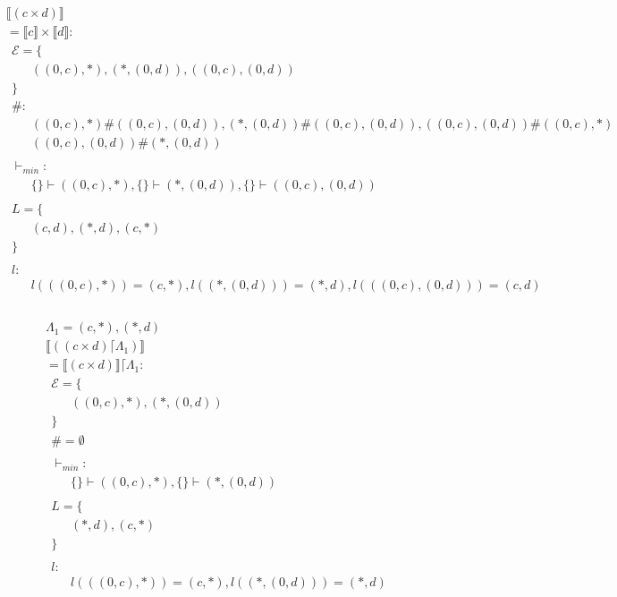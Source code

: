 \begin{align*} 
	 &  & \\ 
	 & \llbracket (c \times d) \rrbracket & \\ 
	 & = \llbracket c \rrbracket \times \llbracket d \rrbracket:  & \\ 
	 & \ \ \mathcal{{E}}= \{  & \\ 
	 & \qquad ((0, c), *), (*, (0, d)), ((0, c), (0, d)) \\ 
	 & \ \ \} & \\ 
	 & \ \ \#: & \\ 
	 & \qquad ((0, c), *) \# ((0, c), (0, d)), (*, (0, d)) \# ((0, c), (0, d)), ((0, c), (0, d)) \# ((0, c), *) \\ 
	 & \qquad ((0, c), (0, d)) \# (*, (0, d)) \\ 
	 & \ \  & \\ 
	 & \ \ \vdash_{{min}}: & \\ 
	 & \qquad \{  \} \vdash ((0, c), *), \{  \} \vdash (*, (0, d)), \{  \} \vdash ((0, c), (0, d)) \\ 
	 & \ \  & \\ 
	 & \ \ L=\{ & \\ 
	 & \qquad (c, d), (*, d), (c, *) \\ 
	 & \ \ \} & \\ 
	 & \ \  & \\ 
	 & \ \ l: & \\ 
	 & \qquad l(((0, c), *)) = (c, *), l((*, (0, d))) = (*, d), l(((0, c), (0, d))) = (c, d) \\ 
	 & \ \  & \\ 
\end{align*} 

\begin{align*} 
	 & \Lambda_1 = {(c, *), (*, d)} & \\ 
	 & \llbracket ((c \times d) \lceil \Lambda_1) \rrbracket & \\ 
	 & = \llbracket (c \times d) \rrbracket \lceil \Lambda_1:  & \\ 
	 & \ \ \mathcal{{E}}= \{  & \\ 
	 & \qquad ((0, c), *), (*, (0, d)) \\ 
	 & \ \ \} & \\ 
	 & \ \ \# = \emptyset & \\ 
	 & \ \  & \\ 
	 & \ \ \vdash_{{min}}: & \\ 
	 & \qquad \{  \} \vdash ((0, c), *), \{  \} \vdash (*, (0, d)) \\ 
	 & \ \  & \\ 
	 & \ \ L=\{ & \\ 
	 & \qquad (*, d), (c, *) \\ 
	 & \ \ \} & \\ 
	 & \ \  & \\ 
	 & \ \ l: & \\ 
	 & \qquad l(((0, c), *)) = (c, *), l((*, (0, d))) = (*, d) \\ 
	 & \ \  & \\ 
\end{align*} 

